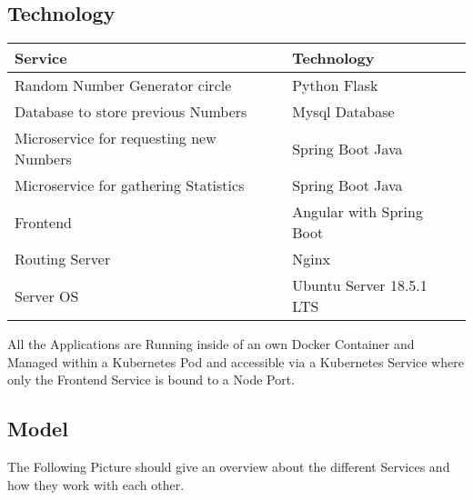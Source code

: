 \subsection{Technology}
\begin{table}[h]
\begin{tabular}{ll}
\textbf{Service} & \textbf{Technology}  \\ \hline
Random Number Generator circle& Python Flask \\
Database to store previous Numbers & Mysql Database \\
Microservice for requesting new Numbers & Spring Boot Java \\
Microservice for gathering Statistics & Spring Boot Java \\
Frontend & Angular with Spring Boot \\
Routing Server & Nginx \\
Server OS & Ubuntu Server 18.5.1  LTS
\end{tabular}
\end{table}

All the Applications are Running inside of an own Docker Container and Managed within a Kubernetes Pod and accessible via a Kubernetes Service where only the Frontend Service is bound to a Node Port.
\subsection{Model}
The Following Picture should give an overview about the different Services and how they work with each other.

